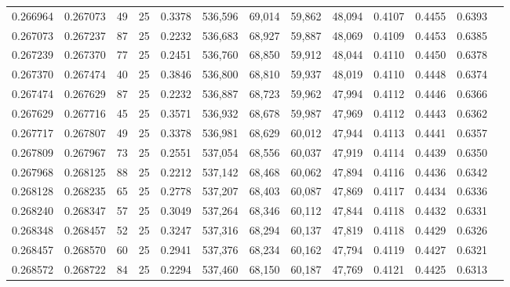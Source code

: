 \begin{tabular}{rrrrrrrrrrrrr}
0.266964 & 0.267073 &    49 &  25 &                                     0.3378 & 536,596 &  69,014 &  59,862 &  48,094 & 0.4107 & 0.4455 & 0.6393 \\
0.267073 & 0.267237 &    87 &  25 &                                     0.2232 & 536,683 &  68,927 &  59,887 &  48,069 & 0.4109 & 0.4453 & 0.6385 \\
0.267239 & 0.267370 &    77 &  25 &                                     0.2451 & 536,760 &  68,850 &  59,912 &  48,044 & 0.4110 & 0.4450 & 0.6378 \\
0.267370 & 0.267474 &    40 &  25 &                                     0.3846 & 536,800 &  68,810 &  59,937 &  48,019 & 0.4110 & 0.4448 & 0.6374 \\
0.267474 & 0.267629 &    87 &  25 &                                     0.2232 & 536,887 &  68,723 &  59,962 &  47,994 & 0.4112 & 0.4446 & 0.6366 \\
0.267629 & 0.267716 &    45 &  25 &                                     0.3571 & 536,932 &  68,678 &  59,987 &  47,969 & 0.4112 & 0.4443 & 0.6362 \\
0.267717 & 0.267807 &    49 &  25 &                                     0.3378 & 536,981 &  68,629 &  60,012 &  47,944 & 0.4113 & 0.4441 & 0.6357 \\
0.267809 & 0.267967 &    73 &  25 &                                     0.2551 & 537,054 &  68,556 &  60,037 &  47,919 & 0.4114 & 0.4439 & 0.6350 \\
0.267968 & 0.268125 &    88 &  25 &                                     0.2212 & 537,142 &  68,468 &  60,062 &  47,894 & 0.4116 & 0.4436 & 0.6342 \\
0.268128 & 0.268235 &    65 &  25 &                                     0.2778 & 537,207 &  68,403 &  60,087 &  47,869 & 0.4117 & 0.4434 & 0.6336 \\
0.268240 & 0.268347 &    57 &  25 &                                     0.3049 & 537,264 &  68,346 &  60,112 &  47,844 & 0.4118 & 0.4432 & 0.6331 \\
0.268348 & 0.268457 &    52 &  25 &                                     0.3247 & 537,316 &  68,294 &  60,137 &  47,819 & 0.4118 & 0.4429 & 0.6326 \\
0.268457 & 0.268570 &    60 &  25 &                                     0.2941 & 537,376 &  68,234 &  60,162 &  47,794 & 0.4119 & 0.4427 & 0.6321 \\
0.268572 & 0.268722 &    84 &  25 &                                     0.2294 & 537,460 &  68,150 &  60,187 &  47,769 & 0.4121 & 0.4425 & 0.6313 \\

\end{tabular}
